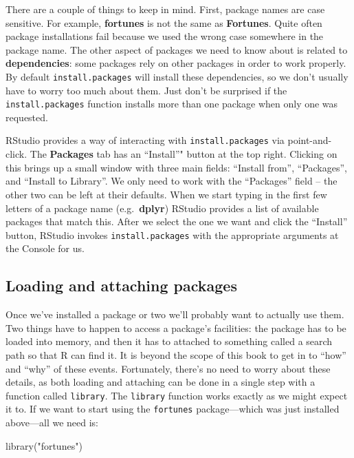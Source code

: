 \documentclass[
]{book}
\newenvironment{Shaded}{\begin{snugshade}}{\end{snugshade}}
\newcommand{\FunctionTok}[1]{\textcolor[rgb]{0.00,0.00,0.00}{#1}}
\newcommand{\NormalTok}[1]{#1}
\newcommand{\StringTok}[1]{\textcolor[rgb]{0.31,0.60,0.02}{#1}}
\begin{document}
There are a couple of things to keep in mind. First, package names are case sensitive. For example, \textbf{fortunes} is not the same as \textbf{Fortunes}. Quite often package installations fail because we used the wrong case somewhere in the package name. The other aspect of packages we need to know about is related to \textbf{dependencies}: some packages rely on other packages in order to work properly. By default \texttt{install.packages} will install these dependencies, so we don't usually have to worry too much about them. Just don't be surprised if the \texttt{install.packages} function installs more than one package when only one was requested.

RStudio provides a way of interacting with \texttt{install.packages} via point-and-click. The \textbf{Packages} tab has an ``Install''" button at the top right. Clicking on this brings up a small window with three main fields: ``Install from'', ``Packages'', and ``Install to Library''. We only need to work with the ``Packages'' field -- the other two can be left at their defaults. When we start typing in the first few letters of a package name (e.g.~\textbf{dplyr}) RStudio provides a list of available packages that match this. After we select the one we want and click the ``Install'' button, RStudio invokes \texttt{install.packages} with the appropriate arguments at the Console for us.

\hypertarget{loading-and-attaching-packages}{%
\subsection{Loading and attaching packages}\label{loading-and-attaching-packages}}

Once we've installed a package or two we'll probably want to actually use them. Two things have to happen to access a package's facilities: the package has to be loaded into memory, and then it has to attached to something called a search path so that R can find it. It is beyond the scope of this book to get in to ``how'' and ``why'' of these events. Fortunately, there's no need to worry about these details, as both loading and attaching can be done in a single step with a function called \texttt{library}. The \texttt{library} function works exactly as we might expect it to. If we want to start using the \texttt{fortunes} package---which was just installed above---all we need is:

\begin{Shaded}
\begin{Highlighting}[]
\FunctionTok{library}\NormalTok{(}\StringTok{"fortunes"}\NormalTok{)}
\end{Highlighting}
\end{Shaded}
\end{document}

